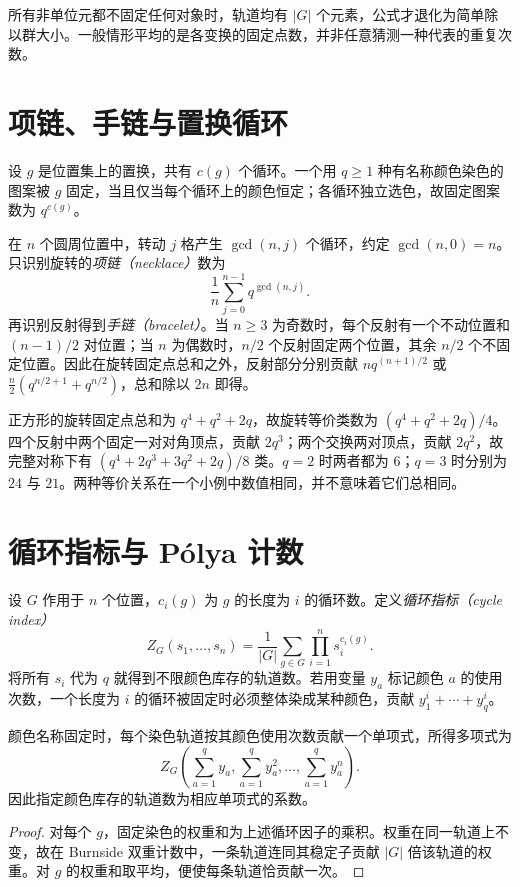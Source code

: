 所有非单位元都不固定任何对象时，轨道均有 $|G|$ 个元素，公式才退化为简单除以群大小。一般情形平均的是各变换的固定点数，并非任意猜测一种代表的重复次数。

\section{项链、手链与置换循环}

设 $g$ 是位置集上的置换，共有 $c(g)$ 个循环。一个用 $q\ge1$ 种有名称颜色染色的图案被 $g$ 固定，当且仅当每个循环上的颜色恒定；各循环独立选色，故固定图案数为 $q^{c(g)}$。

在 $n$ 个圆周位置中，转动 $j$ 格产生 $\gcd(n,j)$ 个循环，约定 $\gcd(n,0)=n$。只识别旋转的\emph{项链（necklace）}数为
\[
 \frac1n\sum_{j=0}^{n-1}q^{\gcd(n,j)}.
\]
再识别反射得到\emph{手链（bracelet）}。当 $n\ge3$ 为奇数时，每个反射有一个不动位置和 $(n-1)/2$ 对位置；当 $n$ 为偶数时，$n/2$ 个反射固定两个位置，其余 $n/2$ 个不固定位置。因此在旋转固定点总和之外，反射部分分别贡献 $nq^{(n+1)/2}$ 或 $\frac n2(q^{n/2+1}+q^{n/2})$，总和除以 $2n$ 即得。

\begin{example}[正方形顶点染色]
正方形的旋转固定点总和为 $q^4+q^2+2q$，故旋转等价类数为 $(q^4+q^2+2q)/4$。四个反射中两个固定一对对角顶点，贡献 $2q^3$；两个交换两对顶点，贡献 $2q^2$，故完整对称下有 $(q^4+2q^3+3q^2+2q)/8$ 类。$q=2$ 时两者都为 $6$；$q=3$ 时分别为 $24$ 与 $21$。两种等价关系在一个小例中数值相同，并不意味着它们总相同。
\end{example}

\section{循环指标与 P\'olya 计数}

设 $G$ 作用于 $n$ 个位置，$c_i(g)$ 为 $g$ 的长度为 $i$ 的循环数。定义\emph{循环指标（cycle index）}
\begin{equation}
 Z_G(s_1,\ldots,s_n)=\frac1{|G|}\sum_{g\in G}\prod_{i=1}^n s_i^{c_i(g)}.
 \label{eq:cycle-index}
\end{equation}
将所有 $s_i$ 代为 $q$ 就得到不限颜色库存的轨道数。若用变量 $y_a$ 标记颜色 $a$ 的使用次数，一个长度为 $i$ 的循环被固定时必须整体染成某种颜色，贡献 $y_1^i+\cdots+y_q^i$。

\begin{theorem}
颜色名称固定时，每个染色轨道按其颜色使用次数贡献一个单项式，所得多项式为
\[
 Z_G\left(\sum_{a=1}^q y_a,\sum_{a=1}^q y_a^2,\ldots,
                 \sum_{a=1}^q y_a^n\right).
\]
因此指定颜色库存的轨道数为相应单项式的系数。
\end{theorem}
\begin{proof}
对每个 $g$，固定染色的权重和为上述循环因子的乘积。权重在同一轨道上不变，故在 Burnside 双重计数中，一条轨道连同其稳定子贡献 $|G|$ 倍该轨道的权重。对 $g$ 的权重和取平均，便使每条轨道恰贡献一次。
\end{proof}

